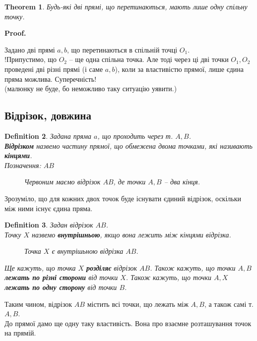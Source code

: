 \documentclass[a4paper, 10pt]{article}
\makeatletter
\def\qed{$\blacksquare$}
\theoremstyle{theoremdd}
\newtheorem{theorem}{Theorem}[subsection]
\theoremstyle{theoremdd}
\theoremstyle{theoremdd}
\newtheorem{definition}[theorem]{Definition}
\theoremstyle{theoremdd}
\theoremstyle{theoremdd}
\theoremstyle{theoremdd}
\theoremstyle{theoremdd}
\theoremstyle{theoremdd}
\theoremstyle{theoremdd}
\renewenvironment{proof}[1][Proof.\\]{\par
\pushQED{\hfill \qed}%
\normalfont \topsep6\p@\@plus6\p@\relax
\trivlist
\item\relax
{\bfseries
#1\@addpunct{.}}\hspace\labelsep\ignorespaces
}{%
\popQED\endtrivlist\@endpefalse
}
\makeatother
\begin{document}
\begin{theorem}
Будь-які дві прямі, що перетинаються, мають лише одну спільну точку.
\end{theorem}

\begin{proof}
Задано дві прямі $a,b$, що перетинаються в спільній точці $O_1$.\\
!Припустимо, що $O_2$ -- ще одна спільна точка. Але тоді через ці дві точки $O_1,O_2$ проведені дві різні прямі (і саме $a,b$), коли за властивістю прямої, лише єдина пряма можлива. Суперечність!\\
(малюнку не буде, бо неможливо таку ситуацію уявити.)
\end{proof}

\subsection{Відрізок, довжина}
\begin{definition}
Задана пряма $a$, що проходить через т. $A,B$.\\
\textbf{Відрізком} назвемо частину прямої, що обмежена двома точками, які називають \textbf{кінцями}.\\
Позначення: $AB$
\begin{figure}[H]
\centering
{}
\caption*{Червоним маємо відрізок $AB$, де точки $A,B$ -- два кінця.}
\end{figure}
\end{definition}
Зрозуміло, що для кожних двох точок буде існувати єдиний відрізок, оскільки між ними існує єдина пряма.

\begin{definition}
Задан відрізок $AB$.\\
Точку $X$ назвемо \textbf{внутрішньою}, якщо вона лежить між кінцями відрізка.
\begin{figure}[H]
\centering
{}
\caption*{Точка $X$ є внутрішьною відрізка $AB$.}
\end{figure}
Ще кажуть, що точка $X$ \textbf{розділяє} відрізок $AB$. Також кажуть, що точки $A,B$ \textbf{лежать по різні сторони} від точки $X$. Також кажуть, що точки $A,X$ \textbf{лежать по одну сторону} від точки $B$.
\end{definition}
Таким чином, відрізок $AB$ містить всі точки, що лежать між $A,B$, а також самі т. $A,B$.
\bigskip \\
До прямої дамо ще одну таку властивість. Вона про взаємне розташування точок на прямій.
\end{document}

